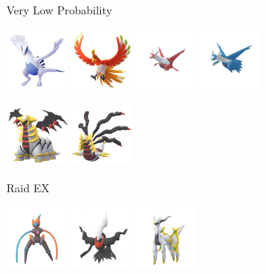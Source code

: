 \documentclass[12pt]{beamer}
\begin{document}
\begin{frame}
\begin{block}{}
\begin{footnotesize}
\begin{center}
\bigskip\bigskip

Very Low Probability

 \includegraphics[width=2cm]{../../images/pokemon/lugia.png}\quad\quad
 \includegraphics[width=2cm]{../../images/pokemon/ho-oh.png}\quad\quad
 \includegraphics[width=2cm]{../../images/pokemon/latias.png}\quad\quad
 \includegraphics[width=2cm]{../../images/pokemon/latios.png}\quad\quad
 
 \includegraphics[width=2cm]{../../images/pokemon/giratina_a.png}\quad\quad
 \includegraphics[width=2cm]{../../images/pokemon/giratina_o.png}


\bigskip\bigskip

Raid EX

 \includegraphics[width=2cm]{../../images/pokemon/deoxys_s.png}\quad\quad
 \includegraphics[width=2cm]{../../images/pokemon/darkrai.png}\quad\quad
 \includegraphics[width=2cm]{../../images/pokemon/arceus_neutral.png} 


\end{center}
\end{footnotesize}
\end{block}
\end{frame}
\end{document}
